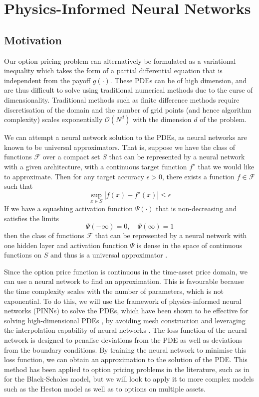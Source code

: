 \section{Physics-Informed Neural Networks}
\label{sec:pinns}

\subsection{Motivation}
Our option pricing problem can alternatively be formulated as a variational inequality which takes the form of a partial differential equation that is independent from the payoff $g(\cdot)$. These PDEs can be of high dimension, and are thus difficult to solve using traditional numerical methods due to the curse of dimensionality. Traditional methods such as finite difference methods require discretisation of the domain and the number of grid points (and hence algorithm complexity) scales exponentially $\mathcal O(N^d)$ with the dimension $d$ of the problem.

We can attempt a neural network solution to the PDEs, as neural networks are known to be universal approximators. That is, suppose we have the class of functions $\mathcal F$ over a compact set $S$ that can be represented by a neural network with a given architecture, with a continuous target function $f^\star$ that we would like to approximate. Then for any target accuracy $\epsilon > 0$, there exists a function $f \in \mathcal F$ such that
\begin{equation}
    \sup_{x \in S} |f(x) - f^\star(x)| \le \epsilon
\end{equation}
If we have a squashing activation function $\Psi(\cdot)$ that is non-decreasing and satisfies the limits
\begin{equation}
    \Psi(-\infty) = 0, \quad \Psi(\infty) = 1
\end{equation}
then the class of functions $\mathcal F$ that can be represented by a neural network with one hidden layer and activation function $\Psi$ is dense in the space of continuous functions on $S$ and thus is a universal approximator \cite{hornik1989multilayer}.

Since the option price function is continuous in the time-asset price domain, we can use a neural network to find an approximation. This is favourable because the time complexity scales with the number of parameters, which is not exponential. To do this, we will use the framework of physics-informed neural networks (PINNs) to solve the PDEs, which have been shown to be effective for solving high-dimensional PDEs \cite{raissi2019physics}, by avoiding mesh construction and leveraging the interpolation capability of neural networks \cite{hu2024tackling}. The loss function of the neural network is designed to penalise deviations from the PDE as well as deviations from the boundary conditions. By training the neural network to minimise this loss function, we can obtain an approximation to the solution of the PDE. This method has been applied to option pricing problems in the literature, such as in \cite{dhiman2023physics} for the Black-Scholes model, but we will look to apply it to more complex models such as the Heston model as well as to options on multiple assets. 

